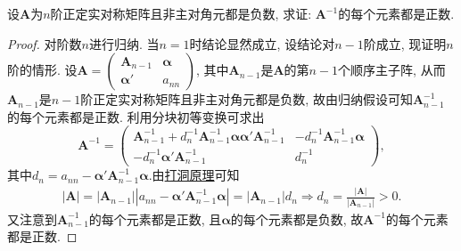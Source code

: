 \documentclass[../../main.tex]{subfiles}
\begin{document}
\begin{example}
设$\boldsymbol{A}$为$n$阶正定实对称矩阵且非主对角元都是负数, 求证: $\boldsymbol{A}^{-1}$的每个元素都是正数.
\end{example}
\begin{proof}
对阶数$n$进行归纳. 当$n = 1$时结论显然成立, 设结论对$n - 1$阶成立, 现证明$n$阶的情形. 设$\boldsymbol{A}=\begin{pmatrix}
\boldsymbol{A}_{n - 1} & \boldsymbol{\alpha} \\
\boldsymbol{\alpha}' & a_{nn}
\end{pmatrix}$, 其中$\boldsymbol{A}_{n - 1}$是$\boldsymbol{A}$的第$n - 1$个顺序主子阵, 从而$\boldsymbol{A}_{n - 1}$是$n - 1$阶正定实对称矩阵且非主对角元都是负数, 故由归纳假设可知$\boldsymbol{A}_{n - 1}^{-1}$的每个元素都是正数. 利用分块初等变换可求出
\[
\boldsymbol{A}^{-1}=\begin{pmatrix}
\boldsymbol{A}_{n - 1}^{-1}+d_n^{-1}\boldsymbol{A}_{n - 1}^{-1}\boldsymbol{\alpha}\boldsymbol{\alpha}'\boldsymbol{A}_{n - 1}^{-1} & -d_n^{-1}\boldsymbol{A}_{n - 1}^{-1}\boldsymbol{\alpha} \\
-d_n^{-1}\boldsymbol{\alpha}'\boldsymbol{A}_{n - 1}^{-1} & d_n^{-1}
\end{pmatrix},
\]
其中$d_n = a_{nn}-\boldsymbol{\alpha}'\boldsymbol{A}_{n - 1}^{-1}\boldsymbol{\alpha}$.由\hyperref[proposition:打洞原理]{打洞原理}可知
\begin{align*}
|\boldsymbol{A}|=\left| \boldsymbol{A}_{n-1} \right|\left| a_{nn}-\boldsymbol{\alpha }' \boldsymbol{A}_{n-1}^{-1}\boldsymbol{\alpha } \right|=\left| \boldsymbol{A}_{n-1} \right|d_n\Rightarrow d_n=\frac{|\boldsymbol{A}|}{|\boldsymbol{A}_{n-1}|}>0.
\end{align*}
又注意到$\boldsymbol{A}_{n - 1}^{-1}$的每个元素都是正数, 且$\boldsymbol{\alpha}$的每个元素都是负数, 故$\boldsymbol{A}^{-1}$的每个元素都是正数. 

\end{proof}
\end{document}
